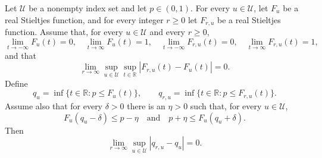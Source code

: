 \begin{theorem}
Let $\mathcal U$ be a nonempty index set and let $p\in(0,1)$.  For every
$u\in\mathcal U$, let $F_u$ be a real Stieltjes function, and for every
integer $r\geq0$ let $F_{r,u}$ be a real Stieltjes function.  Assume that,
for every $u\in\mathcal U$ and every $r\geq0$,
\[
  \lim_{t\to-\infty}F_u(t)=0,
  \quad \lim_{t\to\infty}F_u(t)=1,
  \quad \lim_{t\to-\infty}F_{r,u}(t)=0,
  \quad \lim_{t\to\infty}F_{r,u}(t)=1,
\]
and that
\[
  \lim_{r\to\infty}\sup_{u\in\mathcal U}\sup_{t\in\mathbb R}
    |F_{r,u}(t)-F_u(t)|=0.
\]
Define
\[
  q_u=\inf\{t\in\mathbb R:p\leq F_u(t)\},
  \qquad
  q_{r,u}=\inf\{t\in\mathbb R:p\leq F_{r,u}(t)\}.
\]
Assume also that for every $\delta>0$ there is an $\eta>0$ such that, for
every $u\in\mathcal U$,
\[
  F_u(q_u-\delta)\leq p-\eta
  \quad\text{and}\quad
  p+\eta\leq F_u(q_u+\delta).
\]
Then
\[
  \lim_{r\to\infty}\sup_{u\in\mathcal U}|q_{r,u}-q_u|=0.
\]
\end{theorem}
